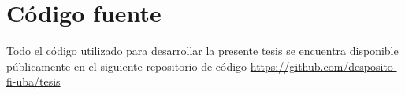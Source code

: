 \section{Código fuente}

Todo el código utilizado para desarrollar la presente tesis se encuentra disponible públicamente en el siguiente repositorio de código \url{https://github.com/desposito-fi-uba/tesis}